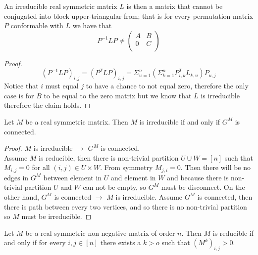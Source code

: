 \documentclass[a4paper, 11pt, oneside]{article}
\newenvironment{problem}[1]
  {\renewcommand\theinnercustomprob{#1}\innercustomprob}
  {\endinnercustomprob}
\begin{document}
\begin{problem}{3.2}\label{problem3.2}
An irreducible real symmetric matrix $L$ is then a matrix that cannot be conjugated into block upper-triangular from; that is for every permutation matrix $P$ conformable with $L$ we have that
\begin{equation*}
P^{-1}LP\neq
\begin{pmatrix}
A  	& B \\ 
0       & C\\
\end{pmatrix} 
\end{equation*}
\end{problem}

\begin{proof}
\begin{equation*}
(P^{-1}LP)_{i,j} = (P^{T}LP)_{i,j} = \Sigma_{u=1}^n (\Sigma_{k=1}^n P^T_{i,k} L_{k,u}) P_{u,j} 
\end{equation*}
Notice that $i$ must equal $j$ to have a chance to not equal zero, therefore the only case is for $B$ to be equal to the zero matrix but we know that $L$ is irreducible therefore the claim holds.
\end{proof}

\begin{problem}{3.3}\label{problem3.3}
Let $M$ be a real symmetric matrix. Then $M$ is irreducible if and only if $G^M$ is connected.
\end{problem}

\begin{proof}
 $M$ is irreducible $\rightarrow$  $G^M$ is connected.\\
 Assume $M$ is reducible, then there is non-trivial partition $U\cup W = [n]$ such that $M_{i,j} = 0$ for all $(i,j)\in U \times W$. From symmetry  $M_{j,i} = 0$. Then there will be no edges in $G^M$ between element in $U$ and element in $W$ and because there is non-trivial partition $U$ and $W$ can not be empty, so $G^M$ must be disconnect.
On the other hand,  $G^M$ is connected $\rightarrow$ $M$ is irreducible.
Assume $G^M$ is connected, then there is path between every two vertices, and so there is no non-trivial partition so $M$ must be irreducible.
\end{proof}

\begin{problem}{3.4}\label{problem3.4}
Let $M$ be a real symmetric non-negative matrix of order $n$. Then $M$ is reducible if and only if for every $i,j\in [n]$ there exists a $k > o$ such that $(M^k)_{i,j}>0$.
\end{problem}
\end{document}
